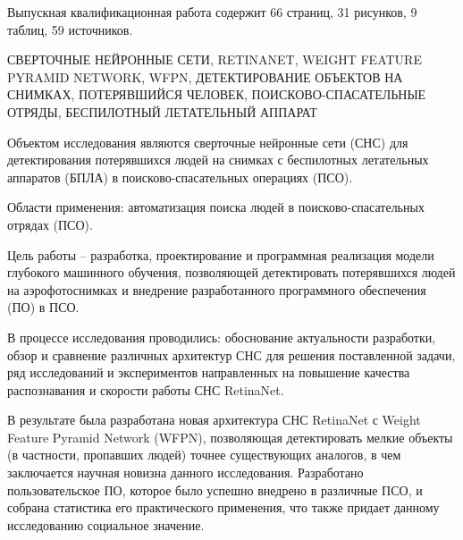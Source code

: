 \documentclass[a4paper,14pt]{extarticle} %
\begin{document}
Выпускная квалификационная работа содержит 66 страниц, 31 рисунков, 9 таблиц, 59 источников.

\MakeUppercase{сверточные нейронные сети, RetinaNet, Weight Feature Pyramid Network, WFPN, детектирование объектов на снимках, потерявшийся человек, поисково-спасательные отряды, беспилотный летательный аппарат}

Объектом исследования являются сверточные нейронные сети (СНС) для детектирования потерявшихся людей на снимках с беспилотных летательных аппаратов (БПЛА) в поисково-спасательных операциях (ПСО).

Области применения: автоматизация поиска людей в поисково-спасательных отрядах (ПСО).

Цель работы -- разработка, проектирование и программная реализация модели глубокого машинного обучения, позволяющей детектировать потерявшихся людей на аэрофотоснимках и внедрение разработанного программного обеспечения (ПО) в ПСО.

В процессе исследования проводились: обоснование актуальности разработки, обзор и сравнение различных архитектур СНС для решения поставленной задачи, ряд исследований и экспериментов направленных на повышение качества распознавания и скорости работы СНС RetinaNet.

В результате была разработана новая архитектура СНС RetinaNet с Weight Feature Pyramid Network (WFPN), позволяющая детектировать мелкие объекты (в частности, пропавших людей) точнее существующих аналогов, в чем заключается научная новизна данного исследования. Разработано пользовательское ПО, которое было успешно внедрено в различные ПСО, и собрана статистика его практического применения, что также придает данному исследованию социальное значение.
\end{document}
